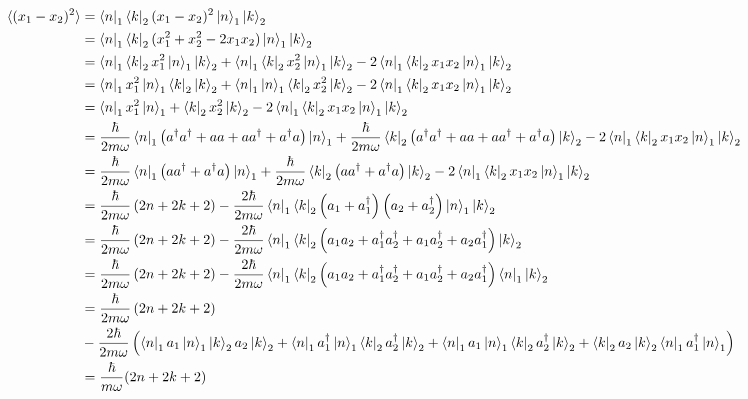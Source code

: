 \documentclass[10pt]{article} %
\begin{document}
\begin{align*}
  \braket{(x_1-x_2)^2} &= \bra{n}_1\bra{k}_2(x_1-x_2)^2\ket{n}_1\ket{k}_2\\
  &= \bra{n}_1\bra{k}_2(x_1^2 + x_2^2 - 2x_1x_2)\ket{n}_1\ket{k}_2\\
  &= \bra{n}_1\bra{k}_2x_1^2\ket{n}_1\ket{k}_2 +
  \bra{n}_1\bra{k}_2x_2^2\ket{n}_1\ket{k}_2 - 2\bra{n}_1\bra{k}_2x_1x_2\ket{n}_1\ket{k}_2\\
  &= \bra{n}_1x_1^2\ket{n}_1\bra{k}_2\ket{k}_2 +
  \bra{n}_1\ket{n}_1\bra{k}_2x_2^2\ket{k}_2 - 2\bra{n}_1\bra{k}_2x_1x_2\ket{n}_1\ket{k}_2\\
  &= \bra{n}_1x_1^2\ket{n}_1 + \bra{k}_2x_2^2\ket{k}_2
  - 2\bra{n}_1\bra{k}_2x_1x_2\ket{n}_1\ket{k}_2\\
  &= \frac{\hbar}{2m\omega}\bra{n}_1
  \left(a^\dagger a^\dagger + aa + aa^\dagger + a^\dagger a\right)\ket{n}_1
  + \frac{\hbar}{2m\omega}\bra{k}_2
  \left(a^\dagger a^\dagger + aa + aa^\dagger + a^\dagger a\right)\ket{k}_2
  - 2\bra{n}_1\bra{k}_2x_1x_2\ket{n}_1\ket{k}_2\\
  &= \frac{\hbar}{2m\omega}\bra{n}_1\left(aa^\dagger + a^\dagger a\right)\ket{n}_1
  + \frac{\hbar}{2m\omega}\bra{k}_2\left(aa^\dagger + a^\dagger a\right)\ket{k}_2
  - 2\bra{n}_1\bra{k}_2x_1x_2\ket{n}_1\ket{k}_2\\
  &= \frac{\hbar}{2m\omega}\left(2n + 2k + 2\right)
  - \frac{2\hbar}{2m\omega}\bra{n}_1\bra{k}_2
  \left(a_1+a_1^\dagger\right)\left(a_2+a_2^\dagger\right)\ket{n}_1\ket{k}_2\\
  &= \frac{\hbar}{2m\omega}\left(2n + 2k + 2\right)
  - \frac{2\hbar}{2m\omega}\bra{n}_1\bra{k}_2
  \left(a_1a_2 + a_1^\dagger a_2^\dagger + a_1a_2^\dagger + a_2a_1^\dagger\right)\ket{k}_2\\
  &= \frac{\hbar}{2m\omega}\left(2n + 2k + 2\right)
  - \frac{2\hbar}{2m\omega}\bra{n}_1\bra{k}_2
  \left(a_1a_2 + a_1^\dagger a_2^\dagger + a_1a_2^\dagger + a_2a_1^\dagger\right)\bra{n}_1\ket{k}_2\\
  &= \frac{\hbar}{2m\omega}\left(2n + 2k + 2\right)\\
  &- \frac{2\hbar}{2m\omega}
  \left(\bra{n}_1a_1\ket{n}_1\ket{k}_2a_2\ket{k}_2
  + \bra{n}_1a_1^\dagger\ket{n}_1\bra{k}_2a_2^\dagger\ket{k}_2
  + \bra{n}_1a_1\ket{n}_1\bra{k}_2a_2^\dagger\ket{k}_2
  + \bra{k}_2a_2\ket{k}_2\bra{n}_1a_1^\dagger\ket{n}_1\right)\\
  &= \frac{\hbar}{m\omega}(2n+2k+2)\\
\end{align*}
\end{document}
